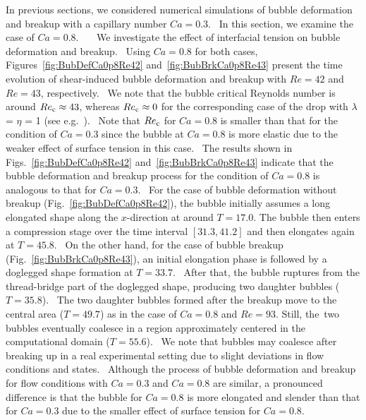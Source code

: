 \documentclass{elsarticle}
\begin{document}
%
%
In previous sections, we considered numerical simulations of bubble deformation and breakup with a capillary number $Ca = 0.3$.  In this section, we examine the case of $Ca=0.8$.    We investigate the effect of interfacial tension on bubble deformation and breakup.  Using $Ca=0.8$ for both cases, Figures~\ref{fig:BubDefCa0p8Re42} and~\ref{fig:BubBrkCa0p8Re43} present the time evolution of shear-induced bubble deformation and breakup with $Re=42$ and $Re=43$, respectively.  We note that the bubble critical Reynolds number is around $Re_{\rm c} \approx 43$, whereas $Re_{\rm c} \approx 0$ for the corresponding case of the drop with $\lambda$ = $\eta$ = 1 (see e.g.~\citet{LiRenRen00}).  Note that $Re_{\rm c}$ for $Ca = 0.8$ is smaller than that for the condition of $Ca = 0.3$ since the bubble at $Ca = 0.8$ is more elastic due to the weaker effect of surface tension in this case.  The results shown in Figs.~\ref{fig:BubDefCa0p8Re42} and~\ref{fig:BubBrkCa0p8Re43} indicate that the bubble deformation and breakup process for the condition of $Ca = 0.8$ is analogous to that for $Ca = 0.3$.  For the case of bubble deformation without breakup (Fig.~\ref{fig:BubDefCa0p8Re42}), the bubble initially assumes a long elongated shape along the $x$-direction at around $T=17.0$. The bubble then enters a compression stage over the time interval $[31.3,41.2]$ and then elongates again at $T = 45.8$.  On the other hand, for the case of bubble breakup (Fig.~\ref{fig:BubBrkCa0p8Re43}), an initial elongation phase is followed by a doglegged shape formation at $T=33.7$.  After that, the bubble ruptures from the thread-bridge part of the doglegged shape, producing two daughter bubbles ($T = 35.8$).  The two daughter bubbles formed after the breakup move to the central area ($T = 49.7$) as in the case of $Ca = 0.8$ and $Re = 93$. Still, the two bubbles eventually coalesce in a region approximately centered in the computational domain ($T = 55.6$).  We note that bubbles may coalesce after breaking up in a real experimental setting due to slight deviations in flow conditions and states.  Although the process of bubble deformation and breakup for flow conditions with $Ca = 0.3$ and $Ca = 0.8$ are similar, a pronounced difference is that the bubble for $Ca = 0.8$ is more elongated and slender than that for $Ca = 0.3$ due to the smaller effect of surface tension for $Ca = 0.8$.
\end{document}
